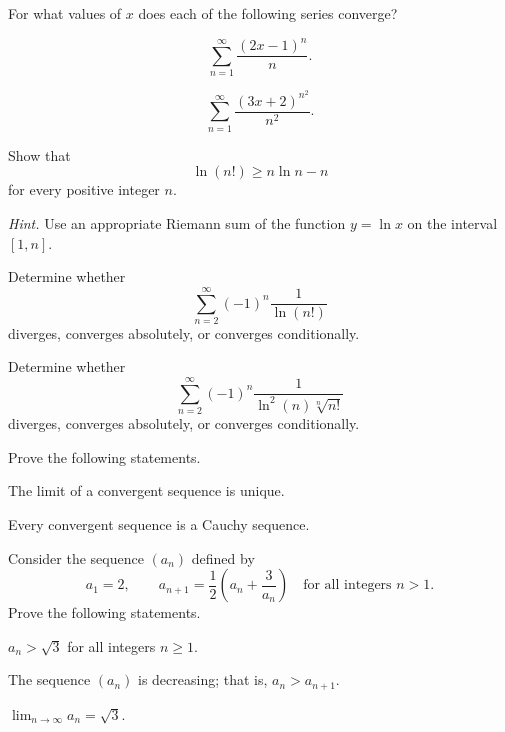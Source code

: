 \begin{problem}
For what values of $x$ does each of the following series converge?
\begin{problemsubparts}
\item
\[
\sum_{n=1}^{\infty}\frac{(2x-1)^n}{n}.
\]
\item
\[
\sum_{n=1}^{\infty}\frac{(3x+2)^{n^2}}{n^2}.
\]
\end{problemsubparts}
\end{problem}
\begin{problem}
\begin{problemsubparts}
\item Show that
\[
\ln(n!)\ge n\ln n-n
\]
for every positive integer $n$.

\textit{Hint.} Use an appropriate Riemann sum of the function $y=\ln x$ on the interval $[1,n]$.
\item Determine whether
\[
\sum_{n=2}^{\infty}(-1)^n\frac{1}{\ln(n!)}
\]
diverges, converges absolutely, or converges conditionally.
\item Determine whether
\[
\sum_{n=2}^{\infty}(-1)^n
\frac{1}{\ln^2(n)\sqrt[n]{n!}}
\]
diverges, converges absolutely, or converges conditionally.
\end{problemsubparts}
\end{problem}

\begin{problem}
Prove the following statements.
\begin{problemsubparts}
\item The limit of a convergent sequence is unique.
\item Every convergent sequence is a Cauchy sequence.
\end{problemsubparts}
\end{problem}

\begin{problem}
Consider the sequence $(a_n)$ defined by
\[
a_1=2,
\qquad
a_{n+1}=\frac12\left(a_n+\frac{3}{a_n}\right)
\quad\text{for all integers }n>1.
\]
Prove the following statements.
\begin{problemsubparts}
\item $a_n>\sqrt3$ for all integers $n\ge1$.
\item The sequence $(a_n)$ is decreasing; that is, $a_n>a_{n+1}$.
\item $\displaystyle\lim_{n\to\infty}a_n=\sqrt3$.
\end{problemsubparts}
\end{problem}

